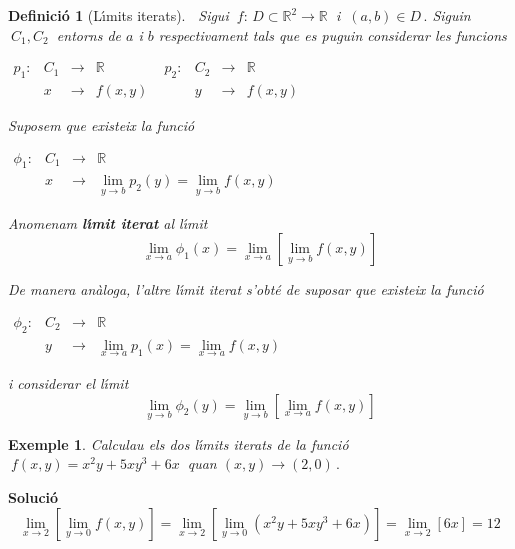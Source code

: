 \documentclass[12pt]{article}
\newcommand{\solucio}{\textbf{Soluci{\'o}}\ \ }
\newtheorem{definicio}{Definici{\'o}}[subsection]
\newtheorem{exemple}{Exemple}[subsection]
\newcommand{\R}{\mathbb{R}}
\begin{document}
\vspace{0.4cm}
\begin{definicio}[L{\'\i}mits iterats]
$\ $
\noindent Sigui $\ f:\, D\subset \R^2 \longrightarrow \R\ $ i $\ (a,b)\in D\,.$ Siguin $\ C_1, C_2 \ $ entorns de $a$ i $b$ respectivament tals que es puguin considerar les funcions

\hspace{3cm}$\begin{array}{cccc}
p_1: & C_1 & \longrightarrow & \R\\
& x & \longrightarrow & f(x,y)
\end{array}$ \hspace{2cm}$\begin{array}{cccc}
p_2: & C_2 & \longrightarrow & \R\\
& y & \longrightarrow & f(x,y)
\end{array}$

Suposem que existeix la funci{\'o}

\hspace{4cm}$\begin{array}{cccl}
\phi_1: & C_1 & \longrightarrow & \R\\
& x & \longrightarrow & \lim\limits_{y\to b} p_2(y)=\lim\limits_{y\to b} f(x,y)
\end{array}$

Anomenam \textbf{l{\'\i}mit iterat} al l{\'\i}mit
$$\lim\limits_{x\to a} \phi_1(x)=\lim_{x\to
a}\left[ \lim_{y\to b} f(x,y)
\right]$$

De manera an{\`a}loga, l'altre l{\'\i}mit iterat s'obt{\'e} de suposar que existeix la funci{\'o}

\hspace{4cm}$\begin{array}{cccl}
\phi_2: & C_2 & \longrightarrow & \R\\
& y & \longrightarrow & \lim\limits_{x\to a} p_1(x)=\lim\limits_{x\to a} f(x,y)
\end{array}$

i considerar el l{\'\i}mit
$$\lim\limits_{y\to b} \phi_2(y)=\lim_{y\to
b}\left[ \lim_{x\to a} f(x,y)\right]$$
\end{definicio}

\begin{exemple}
Calculau els dos l{\'\i}mits iterats de la funci{\'o} $\ f(x,y)=x^2y+5x y^3+6x\ $ quan $(x,y)\longrightarrow (2,0)\,.$
\end{exemple}

\solucio
$$
\lim_{x\to 2}\left[ \lim_{y\to 0} f(x,y)\right]=\lim_{x\to 2}\left[ \lim_{y\to 0} (x^2y+5x y^3+6x)\right]=\lim_{x\to 2}\left[6x\right]=12
$$
\end{document}
